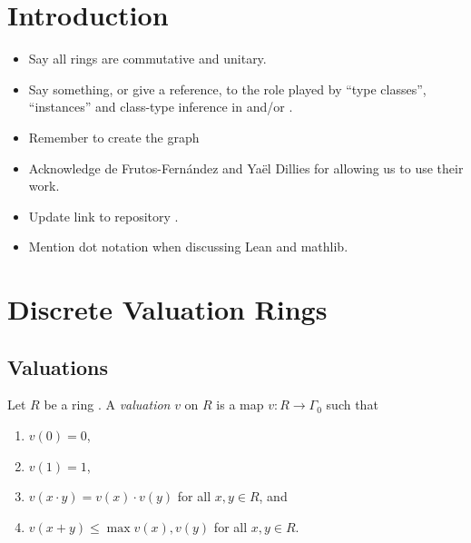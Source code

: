 \documentclass[sigplan,10pt,anonymous,review]{acmart}
\begin{document}
\section{Introduction}
\begin{itemize}
\item Say all rings are commutative and unitary.
\item Say something, or give a reference, to the role played by ``type classes'', ``instances'' and class-type inference in \lean and/or \mathlib.
\item Remember to create the graph
\item Acknowledge de Frutos-Fernández and Yaël Dillies for allowing us to use their work.
\item Update link to repository \href{https://github.com/mariainesdff/local_class_field_theory}{\extlink}.
\item Mention dot notation when discussing Lean and mathlib.

\end{itemize}
\section {Discrete Valuation Rings}\label{section:dvr}

\subsection{Valuations}\label{subsection:valuations}
Let $R$ be a ring . A \emph{valuation} $v$ on $R$ is a map $v \colon R \to \Gamma_0$ such that
\begin{enumerate}
	\item $v (0) = 0$,
	\item $v (1) = 1$,
	\item $v (x \cdot y) = v (x) \cdot v (y)$ for all $x, y \in R$, and
	\item $v (x + y) \le \max {v (x), v (y)}$ for all $x, y \in R$.
\end{enumerate}
\end{document}
